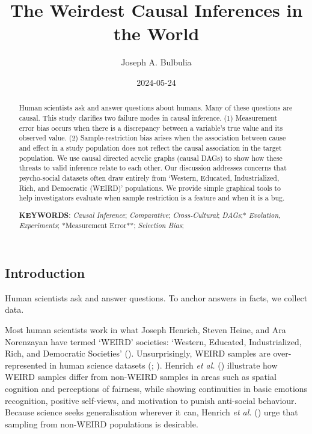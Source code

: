 \documentclass[
  single column]{article}
\title{The Weirdest Causal Inferences in the World}
\author{Joseph A. Bulbulia}
\affil{%
             \small{     Victoria University of Wellington, New Zealand
          ORCID \textcolor[HTML]{A6CE39}{\aiOrcid} ~0000-0002-5861-2056 }
              }
\date{2024-05-24}
\begin{document}
\maketitle
\begin{abstract}
Human scientists ask and answer questions about humans. Many of these
questions are causal. This study clarifies two failure modes in causal
inference. (1) Measurement error bias occurs when there is a discrepancy
between a variable's true value and its observed value. (2)
Sample-restriction bias arises when the association between cause and
effect in a study population does not reflect the causal association in
the target population. We use causal directed acyclic graphs (causal
DAGs) to show how these threats to valid inference relate to each other.
Our discussion addresses concerns that psycho-social datasets often draw
entirely from `Western, Educated, Industrialized, Rich, and Democratic
(WEIRD)' populations. We provide simple graphical tools to help
investigators evaluate when sample restriction is a feature and when it
is a bug.

\textbf{KEYWORDS}: \emph{Causal Inference}; \emph{Comparative};
\emph{Cross-Cultural}; \emph{DAGs};* \emph{Evolution},
\emph{Experiments}; *Measurement Error**; \emph{Selection Bias};
\end{abstract}

\subsection{Introduction}\label{introduction}

Human scientists ask and answer questions. To anchor answers in facts,
we collect data.

Most human scientists work in what Joseph Henrich, Steven Heine, and Ara
Norenzayan have termed `WEIRD' societies: `Western, Educated,
Industrialized, Rich, and Democratic Societies'
().
Unsurprisingly, WEIRD samples are over-represented in human science
datasets (;
). Henrich \emph{et al.}
() illustrate how WEIRD samples
differ from non-WEIRD samples in areas such as spatial cognition and
perceptions of fairness, while showing continuities in basic emotions
recognition, positive self-views, and motivation to punish anti-social
behaviour. Because science seeks generalisation wherever it can, Henrich
\emph{et al.} () urge that
sampling from non-WEIRD populations is desirable.
\end{document}
